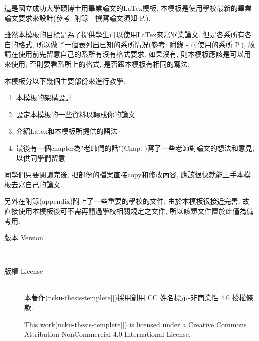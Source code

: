 

這是國立成功大學碩博士用畢業論文的LaTex模板. 本模板是使用學校最新的畢業論文要求來設計(參考: 附錄 - 撰寫論文須知 P.).

雖然本模板的目標是為了提供學生可以使用LaTex來寫畢業論文. 但是各系所有各自的格式, 所以做了一個表列出已知的系所情況(參考: 附錄 - 可使用的系所 P.), 故請在使用前先留意自己的系所有沒有格式要求. 如果沒有, 則本模板應該是可以用來使用; 否則要看系所上的格式, 是否跟本模板有相同的寫法.

本模板分以下幾個主要部份來進行教學:
\begin{enumerate}
  \item 本模板的架構設計
  \item 設定本模板的一些資料以轉成你的論文
  \item 介紹Latex和本模板所提供的語法
  \item 最後有一個chapter為"老師們的話"(Chap. )寫了一些老師對論文的想法和意見, 以供同學們留意
\end{enumerate}
同學們只要閱讀完後, 把部份的檔案直接copy和修改內容, 應該很快就能上手本模板去寫自己的論文.

另外在附錄(appendix)附上了一些重要的學校的文件, 由於本模板很接近完善, 故直接使用本模板後可不需再閱過學校相關規定之文件, 所以該類文件置於此僅為備考用.


\begin{description}
  \item[版本 Version] \hfill \\
    \ThisThesisVersion

  \item[版權 License] \hfill \\
    本著作(ncku-thesis-templete[])採用創用 CC 姓名標示-非商業性 4.0 授權條款.

    This work(ncku-thesis-templete[]) is licensed under a Creative Commons Attribution-NonCommercial 4.0 International License.

\end{description}

\EndChapter
